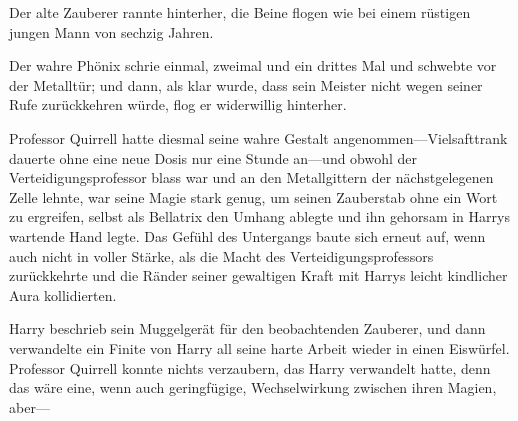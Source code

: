Der alte Zauberer rannte hinterher, die Beine flogen wie bei einem rüstigen jungen Mann von sechzig Jahren.

Der wahre Phönix schrie einmal, zweimal und ein drittes Mal und schwebte vor der Metalltür; und dann, als klar wurde, dass sein Meister nicht wegen seiner Rufe zurückkehren würde, flog er widerwillig hinterher.

\later

Professor Quirrell hatte diesmal seine wahre Gestalt angenommen—Vielsafttrank dauerte ohne eine neue Dosis nur eine Stunde an—und obwohl der Verteidigungsprofessor blass war und an den Metallgittern der nächstgelegenen Zelle lehnte, war seine Magie stark genug, um seinen Zauberstab ohne ein Wort zu ergreifen, selbst als Bellatrix den Umhang ablegte und ihn gehorsam in Harrys wartende Hand legte. Das Gefühl des Untergangs baute sich erneut auf, wenn auch nicht in voller Stärke, als die Macht des Verteidigungsprofessors zurückkehrte und die Ränder seiner gewaltigen Kraft mit Harrys leicht kindlicher Aura kollidierten.

Harry beschrieb sein Muggelgerät für den beobachtenden Zauberer, und dann verwandelte ein Finite von Harry all seine harte Arbeit wieder in einen Eiswürfel. Professor Quirrell konnte nichts verzaubern, das Harry verwandelt hatte, denn das wäre eine, wenn auch geringfügige, Wechselwirkung zwischen ihren Magien, aber—

